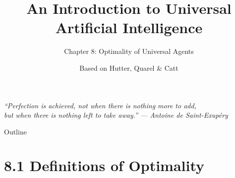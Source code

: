 \documentclass[aspectratio=169,10pt]{beamer}
\title[UAI -- Ch.8 Optimality of Universal Agents]{An Introduction to Universal Artificial Intelligence}
\subtitle{Chapter 8: Optimality of Universal Agents}
\author{Based on Hutter, Quarel \& Catt}
\institute{CRC Press, 2024}
\date{}
\begin{document}

\begin{frame}
  \titlepage
  \begin{center}
  \small\itshape ``Perfection is achieved, not when there is nothing more to add,\\
  but when there is nothing left to take away.'' --- Antoine de Saint-Exup\'ery
  \end{center}
\end{frame}

\begin{frame}{Outline}
  \tableofcontents
\end{frame}

\section{8.1 Definitions of Optimality}
\end{document}
